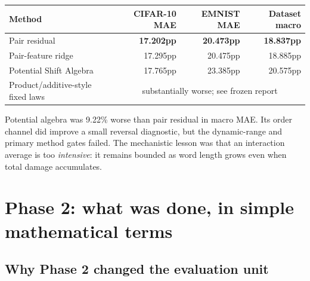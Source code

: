 \documentclass[11pt,a4paper]{article}
\begin{document}
\begin{center}
\begin{tabular}{lrrr}
\toprule
\textbf{Method} & \textbf{CIFAR-10 MAE} & \textbf{EMNIST MAE} & \textbf{Dataset macro}\\
\midrule
Pair residual & \textbf{17.202pp} & \textbf{20.473pp} & \textbf{18.837pp}\\
Pair-feature ridge & 17.295pp & 20.475pp & 18.885pp\\
Potential Shift Algebra & 17.765pp & 23.385pp & 20.575pp\\
Product/additive-style fixed laws & \multicolumn{3}{c}{substantially worse; see frozen report}\\
\bottomrule
\end{tabular}
\end{center}

Potential algebra was 9.22\% worse than pair residual in macro MAE.  Its order
channel did improve a small reversal diagnostic, but the dynamic-range and
primary method gates failed.  The mechanistic lesson was that an
interaction average is too \emph{intensive}: it remains bounded as word length
grows even when total damage accumulates.

\section{Phase 2: what was done, in simple mathematical terms}

\subsection{Why Phase 2 changed the evaluation unit}
\end{document}
